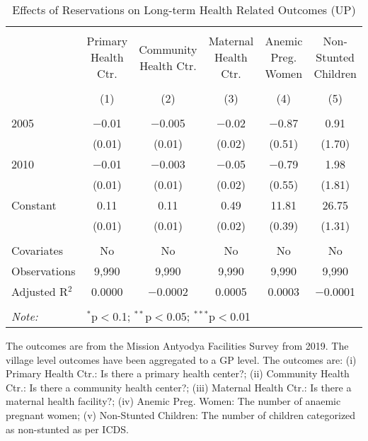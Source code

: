 \begin{sidewaystable}[!htbp]
\centering
\begin{threeparttable}

  \caption{Effects of Reservations on Long-term Health Related Outcomes (UP)} 
  \label{up_shrug_health_05_10} 
\scriptsize 
\begin{tabular}{@{\extracolsep{0pt}}lccccc} 
\\[-1.8ex]\hline 
\hline \\[-1.8ex] 
 & Primary Health Ctr. & Community Health Ctr. & Maternal Health Ctr. & Anemic Preg. Women & Non-Stunted Children \\ 
\\[-1.8ex] & (1) & (2) & (3) & (4) & (5)\\ 
\hline \\[-1.8ex] 
 2005 & $-$0.01 & $-$0.005 & $-$0.02 & $-$0.87 & 0.91 \\ 
  & (0.01) & (0.01) & (0.02) & (0.51) & (1.70) \\ 
  2010 & $-$0.01 & $-$0.003 & $-$0.05 & $-$0.79 & 1.98 \\ 
  & (0.01) & (0.01) & (0.02) & (0.55) & (1.81) \\ 
  Constant & 0.11 & 0.11 & 0.49 & 11.81 & 26.75 \\ 
  & (0.01) & (0.01) & (0.02) & (0.39) & (1.31) \\ 
 \hline \\[-1.8ex] 
Covariates & No & No & No & No & No \\ 
Observations & 9,990 & 9,990 & 9,990 & 9,990 & 9,990 \\ 
Adjusted R$^{2}$ & 0.0000 & $-$0.0002 & 0.0005 & 0.0003 & $-$0.0001 \\ 
\hline 
\hline \\[-1.8ex] 
\textit{Note:}  & \multicolumn{5}{l}{$^{*}$p$<$0.1; $^{**}$p$<$0.05; $^{***}$p$<$0.01} \\ 
\end{tabular} 
\begin{tablenotes}[flushleft]
\setlength{\itemindent}{0em}
\scriptsize
\item The outcomes are from the Mission Antyodya Facilities Survey from 2019. The village level outcomes have been aggregated to a GP level. The outcomes are:
                    (i) Primary Health Ctr.: Is there a primary health center?;
                    (ii) Community Health Ctr.: Is there a community health center?;
                    (iii) Maternal Health Ctr.: Is there a maternal health facility?;
                    (iv) Anemic Preg. Women: The number of anaemic pregnant women;
                    (v) Non-Stunted Children: The number of children categorized as non-stunted as per ICDS.
\end{tablenotes}
\end{threeparttable}
\end{sidewaystable}

